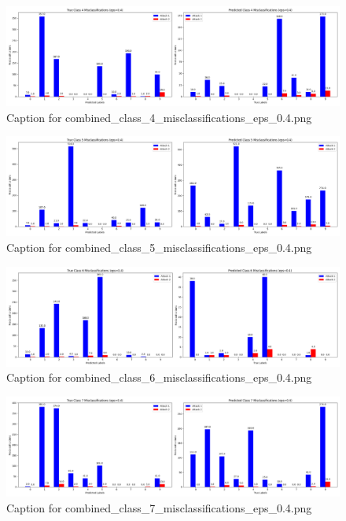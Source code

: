 \documentclass[11pt,onside]{article}
\begin{document}
\begin{figure}[ht]
\centering
\includegraphics[width=1\textwidth]{combined_class_boundary_pgd/combined_class_4_misclassifications_eps_0.4.png}
\caption{Caption for combined_class_4_misclassifications_eps_0.4.png}
\label{fig:combined_class_4_misclassifications_eps_0.4.png}
\end{figure}

\begin{figure}[ht]
\centering
\includegraphics[width=1\textwidth]{combined_class_boundary_pgd/combined_class_5_misclassifications_eps_0.4.png}
\caption{Caption for combined_class_5_misclassifications_eps_0.4.png}
\label{fig:combined_class_5_misclassifications_eps_0.4.png}
\end{figure}

\begin{figure}[ht]
\centering
\includegraphics[width=1\textwidth]{combined_class_boundary_pgd/combined_class_6_misclassifications_eps_0.4.png}
\caption{Caption for combined_class_6_misclassifications_eps_0.4.png}
\label{fig:combined_class_6_misclassifications_eps_0.4.png}
\end{figure}



\begin{figure}[ht]
\centering
\includegraphics[width=1\textwidth]{combined_class_boundary_pgd/combined_class_7_misclassifications_eps_0.4.png}
\caption{Caption for combined_class_7_misclassifications_eps_0.4.png}
\label{fig:combined_class_7_misclassifications_eps_0.4.png}
\end{figure}
\end{document}
